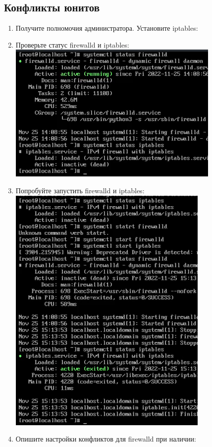 \documentclass[12pt]{article}
\begin{document}
\subsection{Конфликты юнитов}
\begin{enumerate}
	\item Получите полномочия администратора. Установите iptables:
	\item Проверьте статус firewalld и iptables: \\
	      \includegraphics{9.png}
	\item Попробуйте запустить firewalld и iptables: \\
	      \includegraphics{10.png}
	\item Опишите настройки конфликтов для firewalld при наличии: \\

\end{enumerate}
\end{document}
